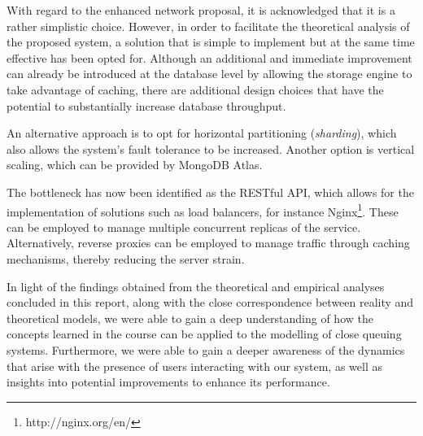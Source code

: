 With regard to the enhanced network proposal, it is acknowledged that it is a rather simplistic choice.
However, in order to facilitate the theoretical analysis of the proposed system, a solution that is simple to implement but at the same time effective has been opted for.
Although an additional and immediate improvement can already be introduced at the database level by allowing the storage engine to take advantage of caching, there are additional design choices that have the potential to substantially increase database throughput.

An alternative approach is to opt for horizontal partitioning (\textit{sharding}), which also allows the system's fault tolerance to be increased.
Another option is vertical scaling, which can be provided by MongoDB Atlas.

The bottleneck has now been identified as the RESTful API, which allows for the implementation of solutions such as load balancers, for instance Nginx\footnote[1]{http://nginx.org/en/}.
These can be employed to manage multiple concurrent replicas of the service.
Alternatively, reverse proxies can be employed to manage traffic through caching mechanisms, thereby reducing the server strain.

In light of the findings obtained from the theoretical and empirical analyses concluded in this report, along with the close correspondence between reality and theoretical models, we were able to gain a deep understanding of how the concepts learned in the course can be applied to the modelling of close queuing systems.
Furthermore, we were able to gain a deeper awareness of the dynamics that arise with the presence of users interacting with our system, as well as insights into potential improvements to enhance its performance.
